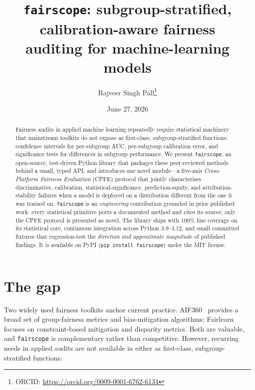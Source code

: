 \documentclass[11pt]{article}
\title{\texttt{fairscope}: subgroup-stratified, calibration-aware fairness\\
auditing for machine-learning models}
\author{Rajveer Singh Pall\thanks{ORCID: \url{https://orcid.org/0009-0001-6762-6134}}}
\date{June 27, 2026}
\begin{document}
\maketitle

\begin{abstract}
Fairness audits in applied machine learning repeatedly require statistical machinery that
mainstream toolkits do not expose as first-class, subgroup-stratified functions: confidence
intervals for per-subgroup AUC, per-subgroup calibration error, and significance tests for
differences in subgroup performance. We present \texttt{fairscope}, an open-source,
test-driven Python library that packages these peer-reviewed methods behind a small, typed
API, and introduces one novel module---a five-axis \emph{Cross-Platform Fairness Evaluation}
(CPFE) protocol that jointly characterises discriminative, calibration,
statistical-significance, prediction-equity, and attribution-stability failures when a model
is deployed on a distribution different from the one it was trained on. \texttt{fairscope} is
an \emph{engineering} contribution grounded in prior published work: every statistical
primitive ports a documented method and cites its source; only the CPFE protocol is presented
as novel. The library ships with 100\% line coverage on its statistical core, continuous
integration across Python 3.9--3.12, and small committed fixtures that regression-test the
\emph{direction and approximate magnitude} of published findings. It is available on PyPI
(\texttt{pip install fairscope}) under the MIT license.
\end{abstract}

\section{The gap}

Two widely used fairness toolkits anchor current practice. AIF360~\cite{aif360} provides a
broad set of group-fairness metrics and bias-mitigation algorithms; Fairlearn~\cite{fairlearn}
focuses on constraint-based mitigation and disparity metrics. Both are valuable, and
\texttt{fairscope} is complementary rather than competitive. However, recurring needs in
applied audits are not available in either as first-class, subgroup-stratified functions:
\end{document}
